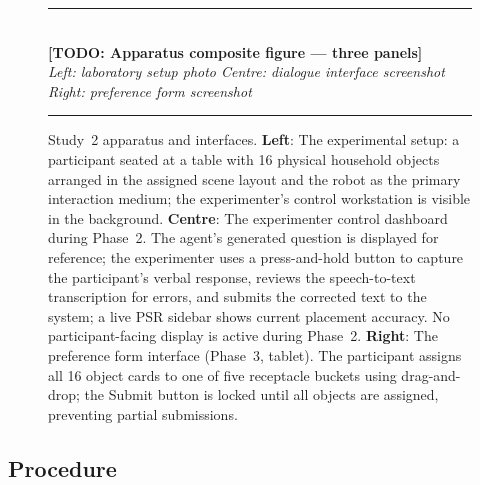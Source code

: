 \documentclass[manuscript,review,anonymous]{acmart}
\begin{document}
\begin{figure}[t]
  \centering
  \noindent\rule{\linewidth}{0.5pt}\\[2.5em]
  {\large\textbf{[TODO: Apparatus composite figure — three panels]}}\\[0.8em]
  \textit{Left: laboratory setup photo \quad Centre: dialogue interface screenshot \quad Right: preference form screenshot}\\[2.5em]
  \rule{\linewidth}{0.5pt}
  \caption{Study~2 apparatus and interfaces. \textbf{Left}: The experimental setup: a participant seated at a table with 16 physical household objects arranged in the assigned scene layout and the robot as the primary interaction medium; the experimenter's control workstation is visible in the background. \textbf{Centre}: The experimenter control dashboard during Phase~2. The agent's generated question is displayed for reference; the experimenter uses a press-and-hold button to capture the participant's verbal response, reviews the speech-to-text transcription for errors, and submits the corrected text to the system; a live PSR sidebar shows current placement accuracy. No participant-facing display is active during Phase~2. \textbf{Right}: The preference form interface (Phase~3, tablet). The participant assigns all 16 object cards to one of five receptacle buckets using drag-and-drop; the Submit button is locked until all objects are assigned, preventing partial submissions.}
  \label{fig:study2-apparatus}
\end{figure}

\subsection{Procedure}
\label{sec:study2:procedure}
\end{document}
